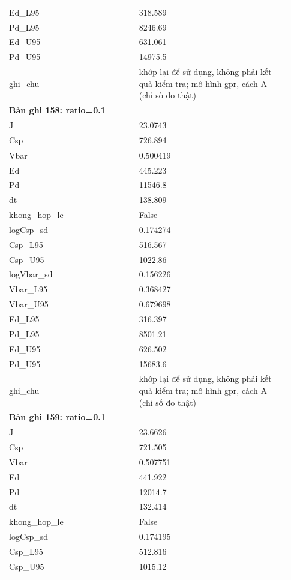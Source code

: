 \begin{longtable}{p{0.43\linewidth}p{0.50\linewidth}}
Ed\_\allowbreak L95 & 318.589 \\
Pd\_\allowbreak L95 & 8246.69 \\
Ed\_\allowbreak U95 & 631.061 \\
Pd\_\allowbreak U95 & 14975.5 \\
ghi\_\allowbreak chu & khớp lại để sử dụng, không phải kết quả kiểm tra; mô hình gpr, cách A (chỉ số đo thật) \\
\midrule
\multicolumn{2}{p{0.95\linewidth}}{\textbf{Bản ghi 158: ratio=0.1}} \\
J & 23.0743 \\
Csp & 726.894 \\
Vbar & 0.500419 \\
Ed & 445.223 \\
Pd & 11546.8 \\
dt & 138.809 \\
khong\_\allowbreak hop\_\allowbreak le & False \\
logCsp\_\allowbreak sd & 0.174274 \\
Csp\_\allowbreak L95 & 516.567 \\
Csp\_\allowbreak U95 & 1022.86 \\
logVbar\_\allowbreak sd & 0.156226 \\
Vbar\_\allowbreak L95 & 0.368427 \\
Vbar\_\allowbreak U95 & 0.679698 \\
Ed\_\allowbreak L95 & 316.397 \\
Pd\_\allowbreak L95 & 8501.21 \\
Ed\_\allowbreak U95 & 626.502 \\
Pd\_\allowbreak U95 & 15683.6 \\
ghi\_\allowbreak chu & khớp lại để sử dụng, không phải kết quả kiểm tra; mô hình gpr, cách A (chỉ số đo thật) \\
\midrule
\multicolumn{2}{p{0.95\linewidth}}{\textbf{Bản ghi 159: ratio=0.1}} \\
J & 23.6626 \\
Csp & 721.505 \\
Vbar & 0.507751 \\
Ed & 441.922 \\
Pd & 12014.7 \\
dt & 132.414 \\
khong\_\allowbreak hop\_\allowbreak le & False \\
logCsp\_\allowbreak sd & 0.174195 \\
Csp\_\allowbreak L95 & 512.816 \\
Csp\_\allowbreak U95 & 1015.12 \\

\end{longtable}
